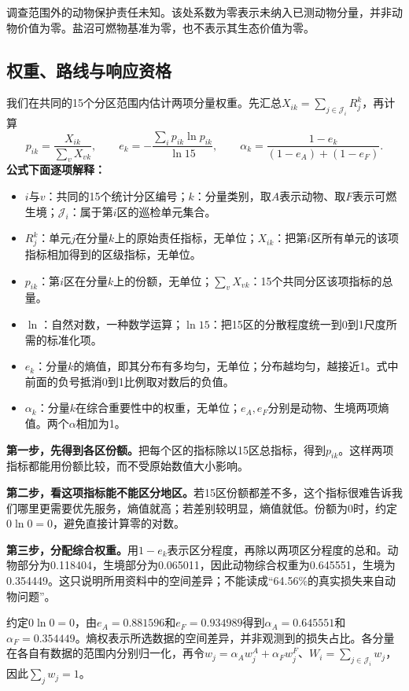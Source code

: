 \documentclass[12pt,a4paper]{article}
\numberwithin{equation}{section}
\begin{document}
调查范围外的动物保护责任未知。该处系数为零表示未纳入已测动物分量，并非动物价值为零。盐沼可燃物基准为零，也不表示其生态价值为零。
\clearpage

\subsection{权重、路线与响应资格}
我们在共同的15个分区范围内估计两项分量权重。先汇总$X_{ik}=\sum_{j\in\mathcal J_i}R_j^k$，再计算
\begin{equation}
p_{ik}=\frac{X_{ik}}{\sum_vX_{vk}},\qquad
e_k=-\frac{\sum_i p_{ik}\ln p_{ik}}{\ln15},\qquad
\alpha_k=\frac{1-e_k}{(1-e_A)+(1-e_F)}.
\label{eq:entropy}
\end{equation}
\noindent\textbf{公式下面逐项解释：}
\begin{itemize}
\item $i$与$v$：共同的15个统计分区编号；$k$：分量类别，取$A$表示动物、取$F$表示可燃生境；$\mathcal J_i$：属于第$i$区的巡检单元集合。
\item $R_j^k$：单元$j$在分量$k$上的原始责任指标，无单位；$X_{ik}$：把第$i$区所有单元的该项指标相加得到的区级指标，无单位。
\item $p_{ik}$：第$i$区在分量$k$上的份额，无单位；$\sum_v X_{vk}$：15个共同分区该项指标的总量。
\item $\ln$：自然对数，一种数学运算；$\ln15$：把15区的分散程度统一到0到1尺度所需的标准化项。
\item $e_k$：分量$k$的熵值，即其分布有多均匀，无单位；分布越均匀，越接近1。式中前面的负号抵消0到1比例取对数后的负值。
\item $\alpha_k$：分量$k$在综合重要性中的权重，无单位；$e_A,e_F$分别是动物、生境两项熵值。两个$\alpha$相加为1。
\end{itemize}
\noindent\textbf{第一步，先得到各区份额。}把每个区的指标除以15区总指标，得到$p_{ik}$。这样两项指标都能用份额比较，而不受原始数值大小影响。

\noindent\textbf{第二步，看这项指标能不能区分地区。}若15区份额都差不多，这个指标很难告诉我们哪里更需要优先服务，熵值就高；若差别较明显，熵值就低。份额为0时，约定$0\ln0=0$，避免直接计算零的对数。

\noindent\textbf{第三步，分配综合权重。}用$1-e_k$表示区分程度，再除以两项区分程度的总和。动物部分为0.118404，生境部分为0.065011，因此动物综合权重为0.645551，生境为0.354449。这只说明所用资料中的空间差异；不能读成“64.56\%的真实损失来自动物问题”。

约定$0\ln0=0$，由$e_A=0.881596$和$e_F=0.934989$得到$\alpha_A=0.645551$和$\alpha_F=0.354449$。熵权表示所选数据的空间差异，并非观测到的损失占比。各分量在各自有数据的范围内分别归一化，再令$w_j=\alpha_Aw_j^A+\alpha_Fw_j^F$、$W_i=\sum_{j\in\mathcal J_i}w_j$，因此$\sum_jw_j=1$。
\end{document}
